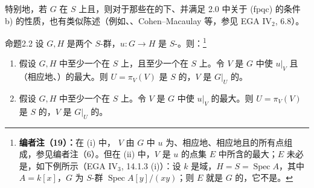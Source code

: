 特别地，若 $G$ 在 $S$ 上且，则对于那些在的下、并满足 2.0 中关于 (fpqc) 的条件 b) 的性质，也有类似陈述（例如、、Cohen--Macaulay 等，参见 EGA IV$_2$, 6.8）。
\begin{SGAresult}{命题}{2.2}
设 $G,H$ 是两个 $S$-群，$u:G\to H$ 是 $S$-。则：\footnote{\textbf{编者注（19）：}在 (i) 中， $V$ 由 $G$ 中 $u$ 为、相应地、相应地且的所有点组成，参见编者注（6）。但在 (ii) 中，$V$ 是 $u$ 的点集 $E$ 中所含的最大；$E$ 未必是，如下例所示（EGA IV$_3$, 14.1.3 (i)）：设 $k$ 是域，$H=S=\operatorname{Spec}A$，其中 $A=k[x]$，$G$ 为 $S$-群 $\operatorname{Spec}A[y]/(xy)$；则 $E$ 就是 $G$ 的，它不是。}
\begin{enumerate}
\item[(i)] 假设 $G,H$ 中至少一个在 $S$ 上，且至少一个在 $S$ 上。令 $V$ 是 $G$ 中使 $u|_V$ 且（相应地、）的最大。则 $U=\pi_V(V)$ 是 $S$ 的，$V$ 是 $G|_U$ 的。
\item[(ii)] 假设 $G,H$ 中至少一个在 $S$ 上。令 $V$ 是 $G$ 中使 $u|_V$ 的最大。则 $U=\pi_V(V)$ 是 $S$ 的，$V$ 是 $G|_U$ 的。
\end{enumerate}
\end{SGAresult}
